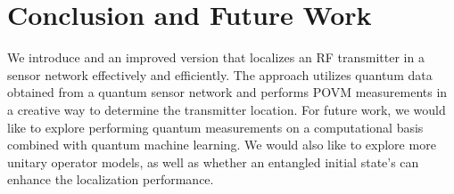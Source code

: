 \section{Conclusion and Future Work}
We introduce \povm and an improved version \povmpro that localizes an RF transmitter in a sensor network effectively and efficiently.
The approach utilizes quantum data obtained from a quantum sensor network and performs POVM measurements in a creative way to determine the transmitter location.
For future work, we would like to explore performing quantum measurements on a computational basis combined with quantum machine learning.
We would also like to explore more unitary operator models, as well as whether an entangled initial state's can enhance the localization performance.